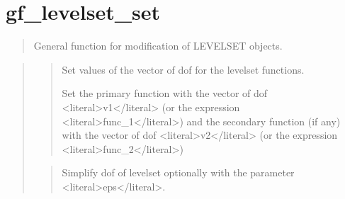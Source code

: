 \documentclass[a4paper,11pt,english]{sphinxmanual}
\begin{document}
\section{gf\_levelset\_set}
\label{\detokenize{scilab/cmdref_gf_levelset_set:gf-levelset-set}}\label{\detokenize{scilab/cmdref_gf_levelset_set::doc}}
\sphinxAtStartPar
{}

\begin{sphinxVerbatim}[commandchars=\\\{\}]
     \PYG{p}{[}   \PYG{p}{]}
  \PYG{p}{[}  \PYG{p}{]}
\end{sphinxVerbatim}

\sphinxAtStartPar
{}
\begin{quote}

\sphinxAtStartPar
General function for modification of LEVELSET objects.
\end{quote}

\sphinxAtStartPar
{}
\begin{quote}

\sphinxAtStartPar
{}
\begin{quote}

\sphinxAtStartPar
Set values of the vector of dof for the level\sphinxhyphen{}set functions.

\sphinxAtStartPar
Set the primary function with the vector of dof \textless{}literal\textgreater{}v1\textless{}/literal\textgreater{} (or the expression
\textless{}literal\textgreater{}func\_1\textless{}/literal\textgreater{}) and the secondary function (if any) with  the vector of dof
\textless{}literal\textgreater{}v2\textless{}/literal\textgreater{} (or the expression \textless{}literal\textgreater{}func\_2\textless{}/literal\textgreater{})
\end{quote}

\sphinxAtStartPar
{}
\begin{quote}

\sphinxAtStartPar
Simplify dof of level\sphinxhyphen{}set optionally with the parameter \textless{}literal\textgreater{}eps\textless{}/literal\textgreater{}.
\end{quote}
\end{quote}
\end{document}
